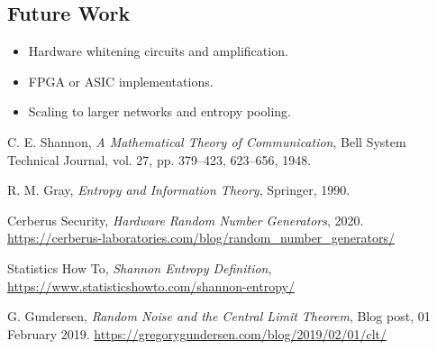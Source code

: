 \subsection{Future Work}
\begin{itemize}
    \item Hardware whitening circuits and amplification.
    \item FPGA or ASIC implementations.
    \item Scaling to larger networks and entropy pooling.
\end{itemize}

\newpage
\begin{thebibliography}{99}  
    \raggedright

C. E. Shannon,
\textit{A Mathematical Theory of Communication},
Bell System Technical Journal,
vol. 27, pp. 379--423, 623--656, 1948.

R. M. Gray,
\textit{Entropy and Information Theory},
Springer, 1990.

Cerberus Security,
\textit{Hardware Random Number Generators},
2020.
\url{https://cerberus-laboratories.com/blog/random_number_generators/}

Statistics How To,
\textit{Shannon Entropy Definition},
\url{https://www.statisticshowto.com/shannon-entropy/}

G. Gundersen,
\textit{Random Noise and the Central Limit Theorem},
Blog post, 01 February 2019.
\url{https://gregorygundersen.com/blog/2019/02/01/clt/}



\end{thebibliography}



